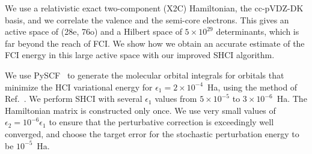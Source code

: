We use a relativistic exact two-component (X2C) Hamiltonian, the cc-pVDZ-DK basis, and we correlate the valence and the semi-core electrons.
This gives an active space of (28e, 76o) and a Hilbert space of $5\times10^{29}$ determinants, which is far beyond the reach of FCI.
We show how we obtain an accurate estimate of the FCI energy in this large active space with our improved SHCI algorithm.

We use PySCF~\cite{SunCha_etal_PySCF-ComMolSci-18} to generate the molecular orbital integrals for orbitals that minimize the HCI variational
energy for $\epsilon_1=2\times 10^{-4}$~Ha, using the method of Ref.~\cite{SmiMusHolSha-JCTC-17}.
We perform SHCI with several $\epsilon_1$ values from $5\times10^{-5}$ to $3\times10^{-6}$~Ha.
The Hamiltonian matrix is constructed only once.
We use very small values of $\epsilon_2 = 10^{-6} \epsilon_1$  to ensure that the perturbative correction is exceedingly well converged,
and choose the target error for the stochastic perturbation energy to be $10^{-5}$~Ha.

